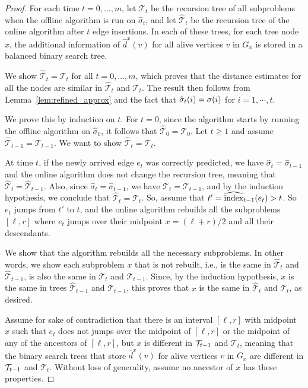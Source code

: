 \begin{proof}
    For each time $t=0,\ldots,m$, let $\mathcal{T}_t$ be the recursion tree of all subproblems when the offline algorithm is run on $\hat{\sigma}_t$, and let $\hat{\mathcal{T}}_t$ be the recursion tree of the online algorithm after $t$ edge insertions. 
    In each of these trees, for each tree node $x$, the additional information of $\hat{d}^x(v)$ for all alive vertices $v$ in $G_x$ is stored in a balanced binary search tree. 
    
    We show $\hat{\mathcal{T}}_t = \mathcal{T}_t$ for all $t=0,\ldots,m$, which proves that the distance estimates for all the nodes are similar in $\hat{\mathcal{T}}_t$ and $\mathcal{T}_t$. 
    The result then follows from Lemma~\ref{lem:refined_approx} and the fact that $\hat{\sigma}_t(i) = \sigma(i)$ for $i = 1, \cdots, t$.   

    We prove this by induction on $t$. 
    For $t=0$, since the algorithm starts by running the offline algorithm on $\hat{\sigma}_0$, it follows that $\hat{\mathcal{T}}_0 = \mathcal{T}_0$. 
    Let $t \geq 1$ and assume $\hat{\mathcal{T}}_{t-1} = \mathcal{T}_{t-1}$.
    We want to show $\hat{\mathcal{T}}_t = \mathcal{T}_t$.
    
    At time $t$, if the newly arrived edge $e_t$ was correctly predicted, we have $\hat{\sigma}_{t}=\hat{\sigma}_{t-1}$ and the online algorithm does not change the recursion tree, meaning that $\hat{\mathcal{T}}_t=\hat{\mathcal{T}}_{t-1}$.
    Also, since $\hat{\sigma}_{t}=\hat{\sigma}_{t-1}$, we have $\mathcal{T}_t=\mathcal{T}_{t-1}$, and by the induction hypothesis, we conclude that $\hat{\mathcal{T}}_t=\mathcal{T}_t$.
    So, assume that $t'=\widehat{\text{index}}_{t-1}(e_t)>t$. So $e_t$ jumps from $t'$ to $t$, and the online algorithm rebuilds all the subproblems $[\ell,r]$ where $e_t$ jumps over their midpoint $x=(\ell+r)/2$ and all their descendants.  

    We show that the algorithm rebuilds all the necessary subproblems.
    In other words, we show each subproblem $x$ that is not rebuilt, i.e., is the same in $\hat{\mathcal{T}}_{t}$ and $\hat{\mathcal{T}}_{t-1}$, is also the same in $\mathcal{T}_{t}$ and $\mathcal{T}_{t-1}$.
    Since, by the induction hypothesis, $x$ is the same in trees $\hat{\mathcal{T}}_{t-1}$ and $\mathcal{T}_{t-1}$, this proves that $x$ is the same in $\hat{\mathcal{T}}_{t}$ and $\mathcal{T}_{t}$, as desired.
    
    Assume for sake of contradiction that there is an interval $[\ell, r]$  with midpoint $x$ such that $e_t$ does not jumps over the midpoint of $[\ell, r]$ or the midpoint of any of the ancestors of $[\ell, r]$, but $x$ is different in $\mathcal{T}_{t-1}$ and $\mathcal{T}_t$, meaning that the binary search trees that store $\hat{d}^x(v)$ for alive vertices $v$ in $G_x$ are different in $\mathcal{T}_{t-1}$ and $\mathcal{T}_t$.
    Without loss of generality, assume no ancestor of $x$ has these properties. 
    

\end{proof}

